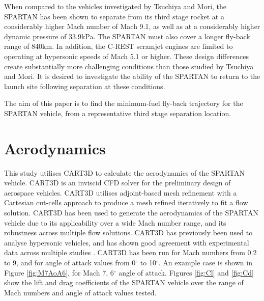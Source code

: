 \documentclass[conf]{new-aiaa}
\begin{document}
When compared to the vehicles investigated by Tsuchiya and Mori\cite{Tsuchiya2005}, the SPARTAN has been shown to separate from its third stage rocket at a considerably higher Mach number of Mach 9.1, as well as at a considerably higher dynamic pressure of 33.9kPa. The SPARTAN must also cover a longer fly-back range of 840km. In addition, the C-REST scramjet engines are limited to operating at hypersonic speeds of Mach 5.1 or higher. These design differences create substantially more challenging conditions than those studied by Tsuchiya and Mori. It is desired to investigate the ability of the SPARTAN to return to the launch site following separation at these conditions. 

The aim of this paper is to find the minimum-fuel fly-back trajectory for the SPARTAN vehicle, from a representative third stage separation location. 











\section{Aerodynamics}
 This study utilises CART3D to calculate the aerodynamics of the SPARTAN vehicle\cite{CART3D}. CART3D is an inviscid CFD solver for the preliminary design of aerospace vehicles. CART3D utilises adjoint-based mesh refinement with a Cartesian cut-cells approach to produce a mesh refined iteratively to fit a flow solution\cite{Aftosmis1997}. CART3D has been used to generate the aerodynamics of the SPARTAN vehicle due to its applicability over a wide Mach number range, and its robustness across multiple flow solutions. CART3D has previously been used to analyse hypersonic vehicles, and has shown good agreement with experimental data across multiple studies \cite{Sagerman2017,Aftosmis2011}. CART3D has been run for Mach numbers from 0.2 to 9, and for angle of attack values from 0$^\circ$ to 10$^\circ$. An example case is shown in Figure \ref{fig:M7AoA6}, for Mach 7, 6$^\circ$ angle of attack. Figures \ref{fig:Cl} and \ref{fig:Cd} show the lift and drag coefficients of the SPARTAN vehicle over the range of Mach numbers and angle of attack values tested. 
 
\end{document}
